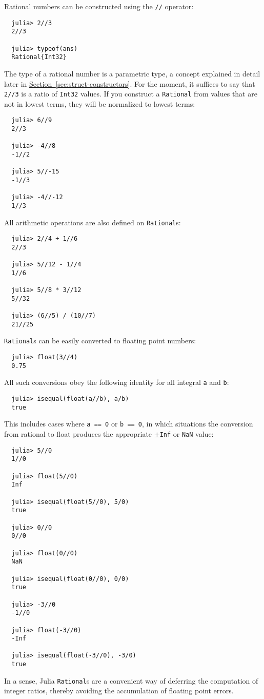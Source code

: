 \documentclass{article}
\newcommand{\Section}[1]{\hyperref[sec:#1]{Section~\ref*{sec:#1}}}
\begin{document}
Rational numbers can be constructed using the \texttt{//} operator:
\begin{verbatim}
  julia> 2//3
  2//3

  julia> typeof(ans)
  Rational{Int32}
\end{verbatim}
The type of a rational number is a parametric type, a concept explained in detail later in \Section{struct-constructors}.
For the moment, it suffices to say that \verb|2//3| is a ratio of \verb|Int32| values.
If you construct a \verb|Rational| from values that are not in lowest terms, they will be normalized to lowest terms:
\begin{verbatim}
  julia> 6//9
  2//3

  julia> -4//8
  -1//2

  julia> 5//-15
  -1//3

  julia> -4//-12
  1//3
\end{verbatim}
All arithmetic operations are also defined on \verb|Rational|s:
\begin{verbatim}
  julia> 2//4 + 1//6
  2//3

  julia> 5//12 - 1//4
  1//6

  julia> 5//8 * 3//12
  5//32

  julia> (6//5) / (10//7)
  21//25
\end{verbatim} %
\verb|Rational|s can be easily converted to floating point numbers:
\begin{verbatim}
  julia> float(3//4)
  0.75
\end{verbatim}
All such conversions obey the following identity for all integral \verb|a| and \verb|b|:
\begin{verbatim}
  julia> isequal(float(a//b), a/b)
  true
\end{verbatim}
This includes cases where \verb|a == 0| or \verb|b == 0|, in which situations the conversion from rational to float produces the appropriate $\pm$\verb|Inf| or \verb|NaN| value:
\begin{verbatim}
  julia> 5//0
  1//0

  julia> float(5//0)
  Inf

  julia> isequal(float(5//0), 5/0)
  true

  julia> 0//0
  0//0

  julia> float(0//0)
  NaN

  julia> isequal(float(0//0), 0/0)
  true

  julia> -3//0
  -1//0

  julia> float(-3//0)
  -Inf

  julia> isequal(float(-3//0), -3/0)
  true
\end{verbatim}
In a sense, Julia \verb|Rational|s are a convenient way of deferring the computation of integer ratios, thereby avoiding the accumulation of floating point errors.
\end{document}
